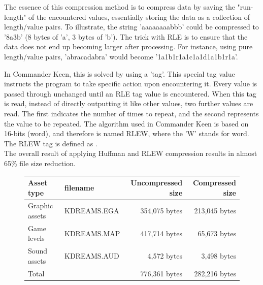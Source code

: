 \documentclass[book.tex]{subfiles}
\begin{document}
\par
The essence of this compression method is to compress data by saving the "run-length" of the encountered values, essentially storing the data as a collection of length/value pairs. To illustrate, the string 'aaaaaaaabbb' could be compressed to '8a3b' (8 bytes of 'a', 3 bytes of 'b'). The trick with RLE is to ensure that the data does not end up becoming larger after processing. For instance, using pure length/value pairs, 'abracadabra' would become '1a1b1r1a1c1a1d1a1b1r1a'.\\

\par
In Commander Keen, this is solved by using a 'tag'. This special tag value instructs the program to take specific action upon encountering it. Every value is passed through unchanged until an RLE tag value is encountered. When this tag is read, instead of directly outputting it like other values, two further values are read. The first indicates the number of times to repeat, and the second represents the value to be repeated. The algorithm used in Commander Keen is based on 16-bits (word), and therefore is named RLEW, where the 'W' stands for word. The RLEW tag is defined as .\\

The overall result of applying Huffman and RLEW compression results in almost 65\% file size reduction.\\

\begin{figure}[H]
\centering
{\renewcommand{\arraystretch}{1.2} %
\begin{tabularx}{\textwidth}{X X r r }
  \hline
  \textbf{Asset type} & \textbf{filename} & \textbf{Uncompressed size\protect\footnotemark} & \textbf{Compressed size}\\ \hline
  Graphic assets & KDREAMS.EGA & 354,075 bytes & 213,045 bytes \\
  Game levels & KDREAMS.MAP & 417,714 bytes & 65,673 bytes\\ 
  Sound assets & KDREAMS.AUD & 4,572 bytes & 3,498 bytes\\ \hline
  Total &  & 776,361 bytes & 282,216 bytes\\ \hline
\end{tabularx}
}
\end{figure}

\addtocounter{footnote}{-1}


\par
\begin{minipage}{\textwidth}
 \par
 \end{minipage}\\
 
 
\end{document}
